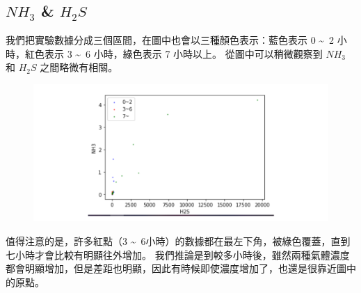 	\subsection{$NH_3$ \& $H_2S$}
		我們把實驗數據分成三個區間，在圖中也會以三種顏色表示：藍色表示 0 \textasciitilde \ 2 小時，紅色表示 3 \textasciitilde \ 6 小時，綠色表示 7 小時以上。
		從圖中可以稍微觀察到 $NH_3$ 和 $H_2S$ 之間略微有相關。
		\begin{figure}[H]
			\centering
			\includegraphics[width=1.0\textwidth]{pic/NH3_H2S.png}
		\end{figure}
		值得注意的是，許多紅點（3 \textasciitilde \ 6小時）的數據都在最左下角，被綠色覆蓋，直到七小時才會比較有明顯往外增加。
		我們推論是到較多小時後，雖然兩種氣體濃度都會明顯增加，但是差距也明顯，因此有時候即使濃度增加了，也還是很靠近圖中的原點。

